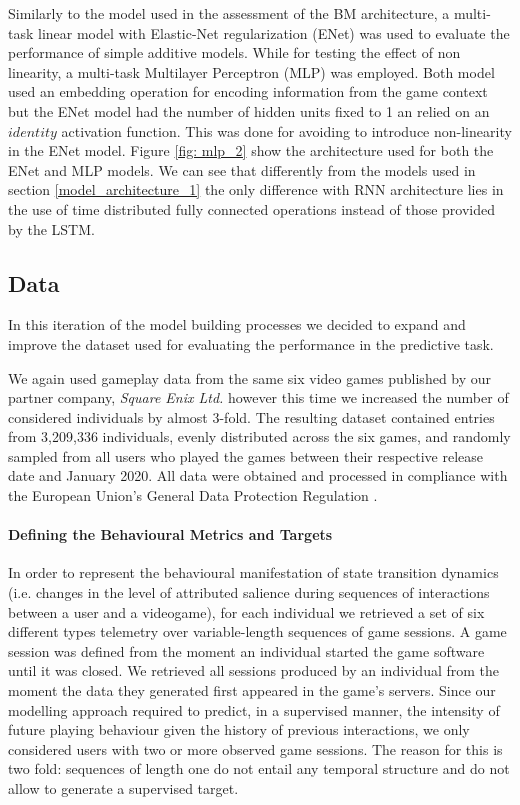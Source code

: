 Similarly to the model used in the assessment of the BM architecture, a multi-task linear model with Elastic-Net regularization (ENet) \cite{zou2005regularization} was used to evaluate the performance of simple additive models. While for testing the effect of non linearity, a multi-task Multilayer Perceptron (MLP) was employed. Both model used an embedding operation for encoding information from the game context but the ENet model had the number of hidden units fixed to 1 an relied on an $identity$ activation function. This was done for avoiding to introduce non-linearity in the ENet model. Figure \ref{fig: mlp_2} show the architecture used for both the ENet and MLP models. We can see that differently from the models used in section \ref{model_architecture_1} the only difference with RNN architecture lies in the use of time distributed fully connected operations instead of those provided by the LSTM. 


\subsection{Data}
\label{data_2}
In this iteration of the model building processes we decided to expand and improve the dataset used for evaluating the performance in the predictive task. 

We again used gameplay data from the same six video games published by our partner company, \textit{Square Enix Ltd.} however this time we increased the number of considered individuals by almost 3-fold. The resulting dataset contained entries from 3,209,336 individuals, evenly distributed across the six games, and randomly sampled from all users who played the games between their respective release date and January 2020. All data were obtained and processed in compliance with the European Union's General Data Protection Regulation \cite{EUdataregulations2018}. 

\paragraph*{Defining the Behavioural Metrics and Targets}
In order to represent the behavioural manifestation of state transition dynamics (i.e. changes in the level of attributed salience during sequences of interactions between a user and a videogame), for each individual we retrieved a set of six different types telemetry over variable-length sequences of game sessions. A game session was defined from the moment an individual started the game software until it was closed. We retrieved all sessions produced by an individual from the moment the data they generated first appeared in the game's servers. Since our modelling approach required to predict, in a supervised manner, the intensity of future playing behaviour given the history of previous interactions, we only considered users with two or more observed game sessions. The reason for this is two fold: sequences of length one do not entail any temporal structure and do not allow to generate a supervised target. 

